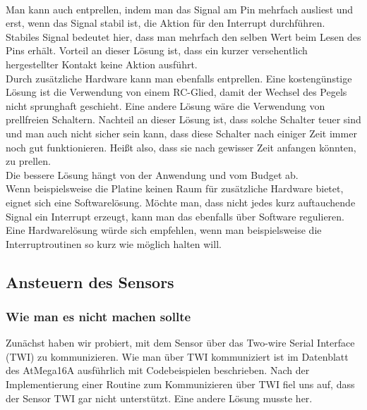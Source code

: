 \documentclass[]{article}
\begin{document}
\\Man kann auch entprellen, indem man das Signal am Pin mehrfach ausliest und erst, wenn das Signal stabil ist, die Aktion für den Interrupt durchführen. Stabiles Signal bedeutet hier, dass man mehrfach den selben Wert beim Lesen des Pins erhält. Vorteil an dieser Lösung ist, dass ein kurzer versehentlich hergestellter Kontakt keine Aktion ausführt.
\\Durch zusätzliche Hardware kann man ebenfalls entprellen. Eine kostengünstige Lösung ist die Verwendung von einem RC-Glied, damit der Wechsel des Pegels nicht sprunghaft geschieht. Eine andere Lösung wäre die Verwendung von prellfreien Schaltern. Nachteil an dieser Lösung ist, dass solche Schalter teuer sind und man auch nicht sicher sein kann, dass diese Schalter nach einiger Zeit immer noch gut funktionieren. Heißt also, dass sie nach gewisser Zeit anfangen könnten, zu prellen.
\\Die bessere Lösung hängt von der Anwendung und vom Budget ab. 
\\Wenn beispielsweise die Platine keinen Raum für zusätzliche Hardware bietet, eignet sich eine Softwarelösung. Möchte man, dass nicht jedes kurz auftauchende Signal ein Interrupt erzeugt, kann man das ebenfalls über Software regulieren. 
\\Eine Hardwarelösung würde sich empfehlen, wenn man beispielsweise die Interruptroutinen so kurz wie möglich halten will. 

\subsection{Ansteuern des Sensors}
\subsubsection{Wie man es nicht machen sollte}
Zunächst haben wir probiert, mit dem Sensor über das Two-wire Serial Interface (TWI) zu kommunizieren. Wie man über TWI kommuniziert ist im Datenblatt des AtMega16A ausführlich mit Codebeispielen beschrieben. Nach der Implementierung einer Routine zum Kommunizieren über TWI fiel uns auf, dass der Sensor TWI gar nicht unterstützt. Eine andere Lösung musste her.
\end{document}
